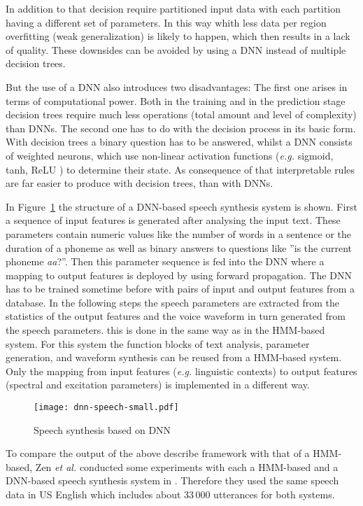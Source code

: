 In addition to that decision require partitioned input data with each partition having a different set of parameters. In this way whith less data per region overfitting (weak generalization) is likely to happen, which then results in a lack of quality. These downsides can be avoided by using a \ac{DNN} instead of multiple decision trees.

But the use of a \ac{DNN} also introduces two disadvantages: The first one arises in terms of computational power. Both in the training and in the prediction stage decision trees require much less operations (total amount and level of complexity) than \acp{DNN}. The second one has to do with the decision process in its basic form. With decision trees a binary question has to be answered, whilst a \ac{DNN} consists of weighted neurons, which use non-linear activation functions (\textit{e.g.} sigmoid, tanh, ReLU \cite{chung:activation}) to determine their state. As consequence of that interpretable rules are far easier to produce with decision trees, than with \acp{DNN}.

In Figure~\ref{fig:dnnspeech} the structure of a \ac{DNN}-based speech synthesis system is shown. First a sequence of input features is generated after analysing the input text. These parameters contain numeric values like the number of words in a sentence or the duration of a phoneme as well as binary answers to questions like ''is the current phoneme \textit{aa}?''. Then this parameter sequence is fed into the \ac{DNN} where a mapping to output features is deployed by using forward propagation. The \ac{DNN} has to be trained sometime before with pairs of input and output features from a database. In the following steps the speech parameters are extracted from the statistics of the output features and the voice waveform in turn generated from the speech parameters. this is done in the same way as in the \ac{HMM}-based system. For this system the function blocks of text analysis, parameter generation, and waveform synthesis can be reused from a \ac{HMM}-based system. Only the mapping from input features (\textit{e.g.} linguistic contexts) to output features (spectral and excitation parameters) is implemented in a different way.

\begin{figure}[h]
	\texttt{[image: dnn-speech-small.pdf]}
	\caption{Speech synthesis based on \ac{DNN} \cite{zen:deepstatistical}}
	\label{fig:dnnspeech}
\end{figure}

To compare the output of the above describe framework with that of a \ac{HMM}-based, Zen \textit{et al.} conducted some experiments with each a \ac{HMM}-based and a \ac{DNN}-based speech synthesis system in \cite{zen:deepstatistical}. Therefore they used the same speech data in US English which includes about 33\,000 utterances for both systems. 

